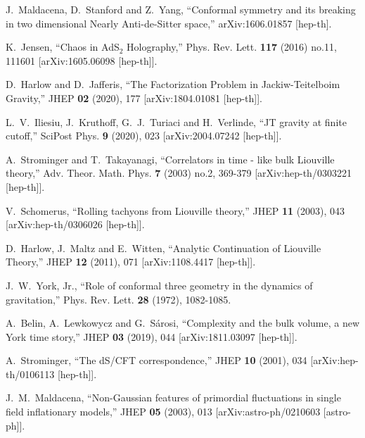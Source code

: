 \documentclass[a4paper,12pt]{article}
\begin{document}
\begin{thebibliography}{}
  J.~Maldacena, D.~Stanford and Z.~Yang,
  ``Conformal symmetry and its breaking in two dimensional Nearly Anti-de-Sitter space,''
  arXiv:1606.01857 [hep-th].

K.~Jensen,
``Chaos in AdS$_2$ Holography,''
Phys. Rev. Lett. \textbf{117} (2016) no.11, 111601
[arXiv:1605.06098 [hep-th]].

D.~Harlow and D.~Jafferis,
``The Factorization Problem in Jackiw-Teitelboim Gravity,''
JHEP \textbf{02} (2020), 177
[arXiv:1804.01081 [hep-th]].

L.~V.~Iliesiu, J.~Kruthoff, G.~J.~Turiaci and H.~Verlinde,
``JT gravity at finite cutoff,''
SciPost Phys. \textbf{9} (2020), 023
[arXiv:2004.07242 [hep-th]].

A.~Strominger and T.~Takayanagi,
``Correlators in time - like bulk Liouville theory,''
Adv. Theor. Math. Phys. \textbf{7} (2003) no.2, 369-379
[arXiv:hep-th/0303221 [hep-th]].

V.~Schomerus,
``Rolling tachyons from Liouville theory,''
JHEP \textbf{11} (2003), 043
[arXiv:hep-th/0306026 [hep-th]].

D.~Harlow, J.~Maltz and E.~Witten,
``Analytic Continuation of Liouville Theory,''
JHEP \textbf{12} (2011), 071
[arXiv:1108.4417 [hep-th]].

J.~W.~York, Jr.,
``Role of conformal three geometry in the dynamics of gravitation,''
Phys. Rev. Lett. \textbf{28} (1972), 1082-1085.

A.~Belin, A.~Lewkowycz and G.~S\'arosi,
``Complexity and the bulk volume, a new York time story,''
JHEP \textbf{03} (2019), 044
[arXiv:1811.03097 [hep-th]].

A.~Strominger,
``The dS/CFT correspondence,''
JHEP \textbf{10} (2001), 034
[arXiv:hep-th/0106113 [hep-th]].

J.~M.~Maldacena,
``Non-Gaussian features of primordial fluctuations in single field inflationary models,''
JHEP \textbf{05} (2003), 013
[arXiv:astro-ph/0210603 [astro-ph]].


\end{thebibliography}
\end{document}
